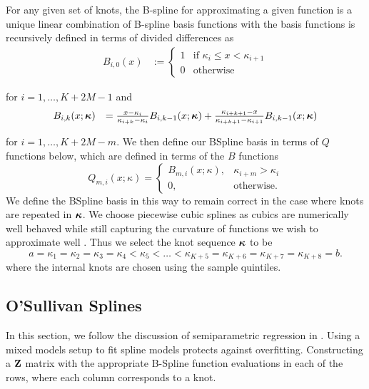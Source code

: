 For any given set of knots, the B-spline for approximating a given function is a unique linear combination of
B-spline basis functions with the basis functions is recursively defined in terms of divided differences as
$$
\begin{array}{rl}
	B_{i, 0}(x) & := \begin{cases}                                                                                                        
	1           & \text{if } \kappa_i \leq x < \kappa_{i+1}                                                                                         \\
	0           & \text{otherwise}                                                                                                        
	\end{cases}
\end{array}
$$

\noindent for $i = 1, \ldots, K + 2M -1$ and
$$
\begin{array}{rl}
	B_{i, k}(x; {\boldsymbol \kappa}) &= \frac{x - \kappa_i}{\kappa_{i + k} - \kappa_i} B_{i, k-1} (x; {\boldsymbol \kappa}) + 
										\frac{\kappa_{i + k + 1} - x}{\kappa_{i + k + 1} - \kappa_{i + 1}} B_{i, k-1} (x; {\boldsymbol \kappa})
\end{array}
$$

\noindent for $i = 1, \ldots, K + 2 M - m$. We then define our BSpline basis in terms of $Q$
functions below, which are defined in terms of the $B$ functions
$$
Q_{m, i}(x; \kappa) =
\begin{cases}
B_{m, i}(x; \kappa),& \kappa_{i + m} > \kappa_i \\
0, & \text{otherwise}.
\end{cases}
$$
We define the BSpline basis in this way to remain correct in the case where knots are repeated in ${\boldsymbol \kappa}$. We
choose piecewise cubic splines as cubics are numerically well behaved while still capturing the curvature of
functions we wish to approximate well \citep{Press:2007:NRE:1403886}. Thus we select the knot sequence
${\boldsymbol \kappa}$ to be
$$
a = \kappa_1 = \kappa_2 = \kappa_3 = \kappa_4 < \kappa_5 < \ldots < \kappa_{K+5} = \kappa_{K+6} = \kappa_{K+7} = \kappa_{K+8} = b.
$$
where the internal knots are chosen using the sample quintiles.

\subsection{O'Sullivan Splines}
In this section, we follow the discussion of semiparametric regression in \cite{ruppert_wand_carroll_2003}.
Using a mixed models setup to fit spline models protects against overfitting. Constructing a ${\bf Z}$ matrix with
the appropriate B-Spline function evaluations in each of the rows, where each column corresponds to a knot.

